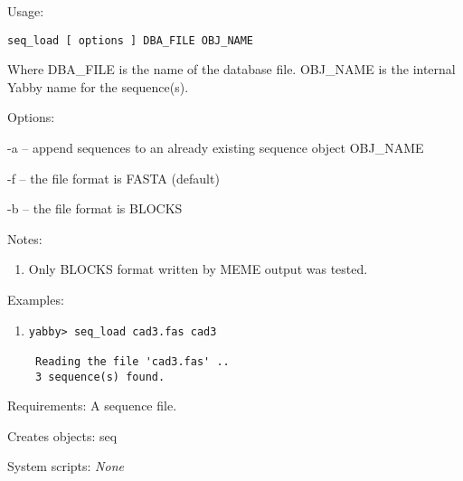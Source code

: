 \begin{description}


\item{Usage:}

{\tt seq\_load [ options ] DBA\_FILE OBJ\_NAME}

Where DBA\_FILE is the name of the database file. OBJ\_NAME is
the internal Yabby name for the sequence(s).


\item{Options:}
\begin{description}
\item -a -- append sequences to an already existing sequence
object OBJ\_NAME
\item -f -- the file format is FASTA (default)
\item -b -- the file format is BLOCKS
\end{description}


\item{Notes:}
\begin{enumerate}
\item Only BLOCKS format written by MEME \cite{meme} output was tested.
\end{enumerate}


\item{Examples:}
\begin{enumerate}

\item
\begin{verbatim}
yabby> seq_load cad3.fas cad3

 Reading the file 'cad3.fas' ..
 3 sequence(s) found.
\end{verbatim}

\end{enumerate}


\item{Requirements:} A sequence file.


\item{Creates objects:} seq


\item{System scripts:} {\em None}

\end{description}

